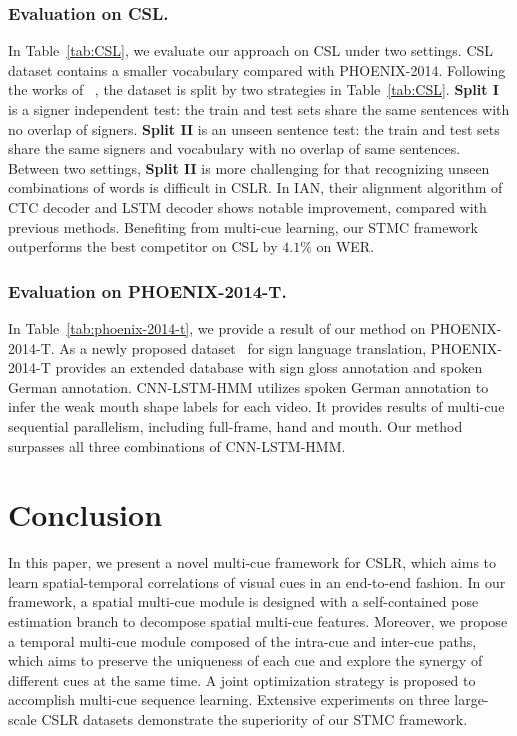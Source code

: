 \documentclass[letterpaper]{article} %
\begin{document}
\subsubsection{Evaluation on CSL.} In Table~\ref{tab:CSL}, we evaluate our approach on CSL under two settings. CSL dataset contains a smaller vocabulary compared with PHOENIX-2014. Following the works of ~\cite{han,hlstm}, the dataset is split by two strategies in Table~\ref{tab:CSL}. \textbf{Split I} is a signer independent test: the train and test sets share the same sentences with no overlap of signers. \textbf{Split II} is an unseen sentence test: the train and test sets share the same signers and vocabulary with no overlap of same sentences. Between two settings, \textbf{Split II} is more challenging for that recognizing unseen combinations of words is difficult in CSLR. In IAN, their alignment algorithm of CTC decoder and LSTM decoder shows notable improvement, compared with previous methods. Benefiting from multi-cue learning, our STMC framework outperforms the best competitor on CSL by $4.1\%$ on WER.

\subsubsection{Evaluation on PHOENIX-2014-T.} In Table~\ref{tab:phoenix-2014-t}, we provide a result of our method on PHOENIX-2014-T. As a newly proposed dataset~\cite{phoenix2014t} for sign language translation, PHOENIX-2014-T provides an extended database with sign gloss annotation and spoken German annotation. CNN-LSTM-HMM utilizes spoken German annotation to infer the weak mouth shape labels for each video. It provides results of multi-cue sequential parallelism, including full-frame, hand and mouth. Our method surpasses all three combinations of CNN-LSTM-HMM.

\section{Conclusion}
In this paper, we present a novel multi-cue framework for CSLR, which aims to learn spatial-temporal correlations of visual cues in an end-to-end fashion. In our framework, a spatial multi-cue module is designed with a self-contained pose estimation branch to decompose spatial multi-cue features. Moreover, we propose a temporal multi-cue module composed of the intra-cue and inter-cue paths, which aims to preserve the uniqueness of each cue and explore the synergy of different cues at the same time. A joint optimization strategy is proposed to accomplish multi-cue sequence learning. Extensive experiments on three large-scale CSLR datasets demonstrate the superiority of our STMC framework.
\end{document}
